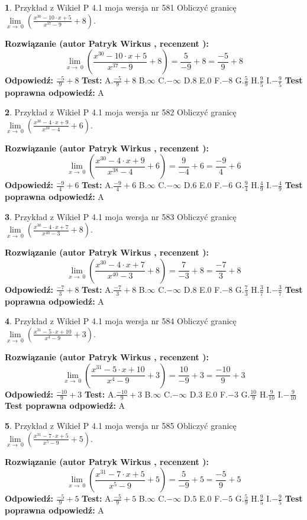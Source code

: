 \documentclass[12pt, a4paper]{article}
\theoremstyle{definition} %
\newtheorem{zad}{}
\newcommand{\zadStart}[1]{\begin{zad}#1\newline}
\newcommand{\zadStop}{\end{zad}}
\newcommand{\rozwStart}[2]{\noindent \textbf{Rozwiązanie (autor #1 , recenzent #2): }\newline}
\newcommand{\rozwStop}{\newline}
\newcommand{\odpStart}{\noindent \textbf{Odpowiedź:}\newline}
\newcommand{\odpStop}{\newline}
\newcommand{\testStart}{\noindent \textbf{Test:}\newline}
\newcommand{\testStop}{\newline}
\newcommand{\kluczStart}{\noindent \textbf{Test poprawna odpowiedź:}\newline}
\newcommand{\kluczStop}{\newline}
\begin{document}
\zadStart{Przykład z Wikieł P 4.1 moja wersja nr 581}
Obliczyć granicę $\lim\limits_{x\to\ 0}(\frac{x^{30}-10 \cdot x +5}{x^{37}-9}+8)$.
\zadStop
\rozwStart{Patryk Wirkus}{}
$$\lim\limits_{x\to\ 0}(\frac{x^{30}-10 \cdot x +5}{x^{37}-9}+8)=\frac{5}{-9}+8=\frac{-5}{9}+8$$
\rozwStop
\odpStart
$\frac{-5}{9}+8$
\odpStop
\testStart
A.$\frac{-5}{9}+8$
B.$\infty$
C.$-\infty$
D.$8$
E.$0$
F.$-8$
G.$\frac{5}{9}$
H.$\frac{9}{5}$
I.$-\frac{9}{5}$
\testStop
\kluczStart
A
\kluczStop



\zadStart{Przykład z Wikieł P 4.1 moja wersja nr 582}
Obliczyć granicę $\lim\limits_{x\to\ 0}(\frac{x^{30}-4 \cdot x +9}{x^{38}-4}+6)$.
\zadStop
\rozwStart{Patryk Wirkus}{}
$$\lim\limits_{x\to\ 0}(\frac{x^{30}-4 \cdot x +9}{x^{38}-4}+6)=\frac{9}{-4}+6=\frac{-9}{4}+6$$
\rozwStop
\odpStart
$\frac{-9}{4}+6$
\odpStop
\testStart
A.$\frac{-9}{4}+6$
B.$\infty$
C.$-\infty$
D.$6$
E.$0$
F.$-6$
G.$\frac{9}{4}$
H.$\frac{4}{9}$
I.$-\frac{4}{9}$
\testStop
\kluczStart
A
\kluczStop



\zadStart{Przykład z Wikieł P 4.1 moja wersja nr 583}
Obliczyć granicę $\lim\limits_{x\to\ 0}(\frac{x^{30}-4 \cdot x +7}{x^{40}-3}+8)$.
\zadStop
\rozwStart{Patryk Wirkus}{}
$$\lim\limits_{x\to\ 0}(\frac{x^{30}-4 \cdot x +7}{x^{40}-3}+8)=\frac{7}{-3}+8=\frac{-7}{3}+8$$
\rozwStop
\odpStart
$\frac{-7}{3}+8$
\odpStop
\testStart
A.$\frac{-7}{3}+8$
B.$\infty$
C.$-\infty$
D.$8$
E.$0$
F.$-8$
G.$\frac{7}{3}$
H.$\frac{3}{7}$
I.$-\frac{3}{7}$
\testStop
\kluczStart
A
\kluczStop



\zadStart{Przykład z Wikieł P 4.1 moja wersja nr 584}
Obliczyć granicę $\lim\limits_{x\to\ 0}(\frac{x^{31}-5 \cdot x +10}{x^{4}-9}+3)$.
\zadStop
\rozwStart{Patryk Wirkus}{}
$$\lim\limits_{x\to\ 0}(\frac{x^{31}-5 \cdot x +10}{x^{4}-9}+3)=\frac{10}{-9}+3=\frac{-10}{9}+3$$
\rozwStop
\odpStart
$\frac{-10}{9}+3$
\odpStop
\testStart
A.$\frac{-10}{9}+3$
B.$\infty$
C.$-\infty$
D.$3$
E.$0$
F.$-3$
G.$\frac{10}{9}$
H.$\frac{9}{10}$
I.$-\frac{9}{10}$
\testStop
\kluczStart
A
\kluczStop



\zadStart{Przykład z Wikieł P 4.1 moja wersja nr 585}
Obliczyć granicę $\lim\limits_{x\to\ 0}(\frac{x^{31}-7 \cdot x +5}{x^{5}-9}+5)$.
\zadStop
\rozwStart{Patryk Wirkus}{}
$$\lim\limits_{x\to\ 0}(\frac{x^{31}-7 \cdot x +5}{x^{5}-9}+5)=\frac{5}{-9}+5=\frac{-5}{9}+5$$
\rozwStop
\odpStart
$\frac{-5}{9}+5$
\odpStop
\testStart
A.$\frac{-5}{9}+5$
B.$\infty$
C.$-\infty$
D.$5$
E.$0$
F.$-5$
G.$\frac{5}{9}$
H.$\frac{9}{5}$
I.$-\frac{9}{5}$
\testStop
\kluczStart
A
\kluczStop
\end{document}
